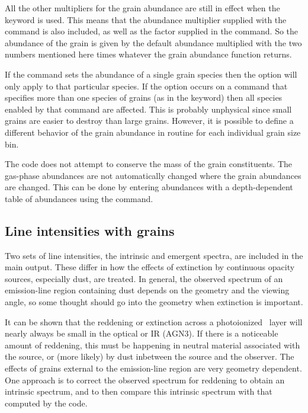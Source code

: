 All the other multipliers for the grain abundance
are still in effect when the keyword  is used.
This means that
the abundance multiplier supplied with the  command
is also included,
as well as the factor supplied in the  command.
So the abundance of the grain is given by the default abundance
multiplied with the two numbers mentioned here times whatever
the grain abundance function returns.

If the  command sets the abundance of
a single grain species then
the  option will only apply to
that particular species.
If the option occurs on a  command
that specifies more than one species of grains (as in the
 keyword) then all species enabled by that command
are affected.
This is probably unphysical since small grains are easier
to destroy than large grains.
However, it is possible to define a different
behavior of the grain abundance in routine 
for each individual grain size bin.

The code does not attempt to conserve the mass of
the grain constituents.
The gas-phase abundances are not automatically changed
where the grain abundances are changed.
This can be done by entering abundances with a depth-dependent
table of abundances using the  command.

\subsection{Line intensities with grains}

Two sets of line intensities, the intrinsic and emergent spectra, are
included in the main output.
These differ in how the effects of extinction by continuous opacity sources,
especially dust, are treated.
In general, the observed spectrum of an emission-line
region containing dust depends on the geometry and the viewing angle,
so some thought should go into the geometry when extinction is important.

It can be shown that the reddening or extinction across
a photoionized \hplus\ layer will nearly always be small in the optical or IR (AGN3).
If there is a noticeable amount of reddening, this must be happening in neutral material
associated with the source, or (more likely) by dust inbetween the source and the observer.
The effects of grains external to the emission-line region are very
geometry dependent.
One approach is to correct the observed spectrum for
reddening to obtain an intrinsic spectrum,
and to then compare this intrinsic
spectrum with that computed by the code.

